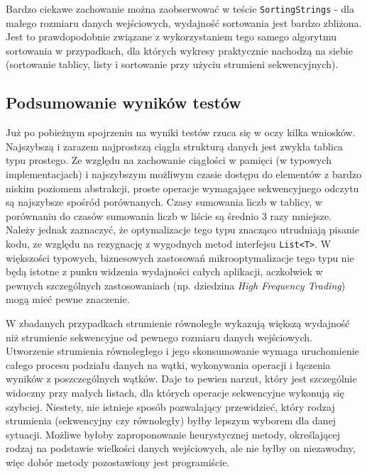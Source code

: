 \documentclass[12pt,twoside,openright]{extarticle}
\begin{document}
    Bardzo ciekawe zachowanie można zaobserwować w teście \texttt{SortingStrings} - dla małego rozmiaru danych wejściowych, wydajność sortowania jest bardzo zbliżona. Jest to prawdopodobnie związane z wykorzystaniem tego samego algorytmu sortowania w przypadkach, dla których wykresy praktycznie nachodzą na siebie (sortowanie tablicy, listy i sortowanie przy użyciu strumieni sekwencyjnych).

\newpage

\subsection{Podsumowanie wyników testów}

    Już po pobieżnym spojrzeniu na wyniki testów rzuca się w oczy kilka wniosków. Najszybszą i zarazem najprostszą ciągła strukturą danych jest zwykła tablica typu prostego. Ze względu na zachowanie ciągłości w pamięci (w typowych implementacjach) i najszybszym możliwym czasie dostępu do elementów z bardzo niskim poziomem abstrakcji, proste operacje wymagające sekwencyjnego odczytu są najszybsze spośród porównanych. Czasy sumowania liczb w tablicy, w porównaniu do czasów sumowania liczb w liście są średnio 3 razy mniejsze. Należy jednak zaznaczyć, że optymalizacje tego typu znacząco utrudniają pisanie kodu, ze względu na rezygnację z wygodnych metod interfejsu \texttt{List<T>}. W większości typowych, biznesowych zastosowań mikrooptymalizacje tego typu nie będą istotne z punku widzenia wydajności całych aplikacji, aczkolwiek w pewnych szczególnych zastosowaniach (np. dziedzina \textit{High Frequency Trading}) mogą mieć pewne znaczenie.

    W zbadanych przypadkach strumienie równoległe wykazują większą wydajność niż strumienie sekwencyjne od pewnego rozmiaru danych wejściowych. Utworzenie strumienia równoległego i jego skonsumowanie wymaga uruchomienie całego procesu podziału danych na wątki, wykonywania operacji i łączenia wyników z poszczególnych wątków. Daje to pewien narzut, który jest szczególnie widoczny przy małych listach, dla których operacje sekwencyjne wykonują się szybciej. Niestety, nie istnieje sposób pozwalający przewidzieć, który rodzaj strumienia (sekwencyjny czy równoległy) byłby lepszym wyborem dla danej sytuacji. Możliwe byłoby zaproponowanie heurystycznej metody, określającej rodzaj na podstawie wielkości danych wejściowych, ale nie byłby on niezawodny, więc dobór metody pozostawiony jest programiście.
\end{document}
